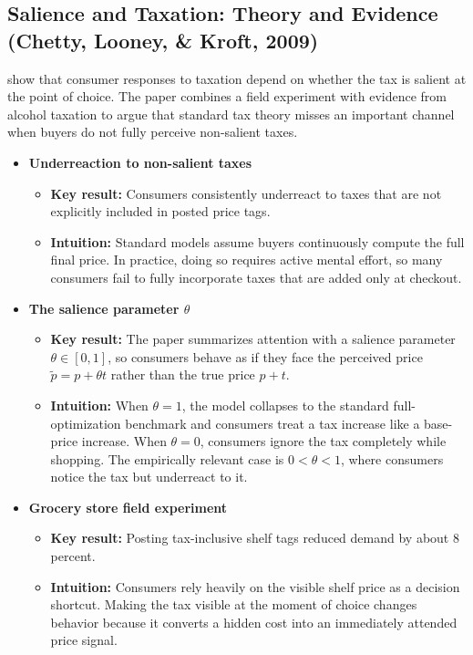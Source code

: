 \documentclass[11pt]{article}
\begin{document}
\subsection{Salience and Taxation: Theory and Evidence (Chetty, Looney, \& Kroft, 2009)}

\citet{chetty_salience_2009} show that consumer responses to taxation depend on
whether the tax is salient at the point of choice.  The paper combines a field
experiment with evidence from alcohol taxation to argue that standard tax
theory misses an important channel when buyers do not fully perceive
non-salient taxes.

\begin{itemize}
    \item \textbf{Underreaction to non-salient taxes}
    \begin{itemize}
        \item \textbf{Key result:} Consumers consistently underreact to taxes
        that are not explicitly included in posted price tags.
        \item \textbf{Intuition:} Standard models assume buyers continuously
        compute the full final price.  In practice, doing so requires active
        mental effort, so many consumers fail to fully incorporate taxes that
        are added only at checkout.
    \end{itemize}

    \item \textbf{The salience parameter $\theta$}
    \begin{itemize}
        \item \textbf{Key result:} The paper summarizes attention with a
        salience parameter $\theta \in [0,1]$, so consumers behave as if they
        face the perceived price $\tilde{p}=p+\theta t$ rather than the true
        price $p+t$.
        \item \textbf{Intuition:} When $\theta=1$, the model collapses to the
        standard full-optimization benchmark and consumers treat a tax increase
        like a base-price increase.  When $\theta=0$, consumers ignore the tax
        completely while shopping.  The empirically relevant case is
        $0<\theta<1$, where consumers notice the tax but underreact to it.
    \end{itemize}

    \item \textbf{Grocery store field experiment}
    \begin{itemize}
        \item \textbf{Key result:} Posting tax-inclusive shelf tags reduced
        demand by about 8 percent.
        \item \textbf{Intuition:} Consumers rely heavily on the visible shelf
        price as a decision shortcut.  Making the tax visible at the moment of
        choice changes behavior because it converts a hidden cost into an
        immediately attended price signal.
    \end{itemize}


\end{itemize}
\end{document}
